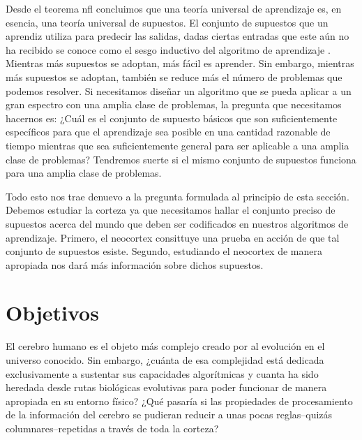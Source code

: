 Desde el teorema \gls{nfl} concluimos que una teoría universal de aprendizaje es,
en esencia, una teoría universal de supuestos.
El conjunto de supuestos que un aprendiz utiliza para predecir las salidas, dadas ciertas entradas
que este aún no ha recibido se conoce como el sesgo inductivo del algoritmo de aprendizaje \cite{Mitchell80theneed,10.1007/BF00993472}.
Mientras más supuestos se adoptan, más fácil es aprender.
Sin embargo, mientras más supuestos se adoptan, también se reduce más el número de problemas que podemos resolver.
Si necesitamos diseñar un algoritmo que se pueda aplicar a un gran espectro con una amplia clase de problemas,
la pregunta que necesitamos hacernos es:
¿Cuál es el conjunto de supuesto básicos que son suficientemente específicos para que el aprendizaje sea posible
en una cantidad razonable de tiempo mientras que sea suficientemente general para ser aplicable a una
amplia clase de problemas?
Tendremos suerte si el mismo conjunto de supuestos funciona para una amplia clase de problemas.

Todo esto nos trae denuevo a la pregunta formulada al principio de esta sección.
Debemos estudiar la corteza ya que necesitamos hallar el conjunto preciso de supuestos
acerca del mundo que deben ser codificados en nuestros algoritmos de aprendizaje.
Primero, el neocortex consittuye una prueba en acción de que tal conjunto de supuestos esiste.
Segundo, estudiando el neocortex de manera apropiada nos dará más información sobre dichos supuestos.





















\section{Objetivos}

El cerebro humano es el objeto más complejo creado por al evolución en el universo conocido.
Sin embargo, ¿cuánta de esa complejidad está dedicada exclusivamente a sustentar sus capacidades algorítmicas
y cuanta ha sido heredada desde rutas biológicas evolutivas para poder funcionar de manera apropiada en su
entorno físico?
¿Qué pasaría si las propiedades de procesamiento de la información del cerebro se pudieran reducir a unas pocas
reglas--quizás columnares--repetidas a través de toda la corteza?

